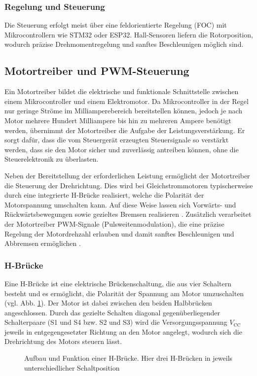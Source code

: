 \subsubsection*{Regelung und Steuerung}
Die Steuerung erfolgt meist über eine feldorientierte Regelung (FOC) mit Mikrocontrollern wie STM32 oder ESP32. Hall-Sensoren liefern die Rotorposition, wodurch präzise Drehmomentregelung und sanftes Beschleunigen möglich sind\autocite{Jaulin2025}.

\subsection{Motortreiber und PWM-Steuerung}
\label{cha:Motortreiber und PWM-Steuerung}

Ein Motortreiber bildet die elektrische und funktionale Schnittstelle zwischen einem Mikrocontroller und einem Elektromotor. Da Mikrocontroller in der Regel nur geringe Ströme im Milliamperebereich bereitstellen können, jedoch je nach Motor mehrere Hundert Milliampere bis hin zu mehreren Ampere benötigt werden, übernimmt der Motortreiber die Aufgabe der Leistungsverstärkung. Er sorgt dafür, dass die vom Steuergerät erzeugten Steuersignale so verstärkt werden, dass sie den Motor sicher und zuverlässig antreiben können, ohne die Steuerelektronik zu überlasten. 

Neben der Bereitstellung der erforderlichen Leistung ermöglicht der Motortreiber die Steuerung der Drehrichtung. Dies wird bei Gleichstrommotoren typischerweise durch eine integrierte H-Brücke realisiert, welche die Polarität der Motorspannung umschalten kann. Auf diese Weise lassen sich Vorwärts- und Rückwärtsbewegungen sowie gezieltes Bremsen realisieren \cite{schröder2018leistungselektronik}. Zusätzlich verarbeitet der Motortreiber PWM-Signale (Pulsweitenmodulation), die eine präzise Regelung der Motordrehzahl erlauben und damit sanftes Beschleunigen und Abbremsen ermöglichen \cite{bolton2015mechatronics}.

\subsubsection{H-Brücke}

Eine H-Brücke ist eine elektrische Brückenschaltung, die aus vier Schaltern besteht und es ermöglicht, die Polarität der Spannung am Motor umzuschalten (vgl. Abb. \ref{fig:H-Brücke}). Der Motor ist dabei zwischen den beiden Halbbrücken angeschlossen. Durch das gezielte Schalten diagonal gegenüberliegender Schalterpaare (S1 und S4 bzw. S2 und S3) wird die Versorgungsspannung 
$V_{\mathrm{CC}}$ jeweils in entgegengesetzter Richtung an den Motor angelegt, wodurch sich die Drehrichtung des Motors steuern lässt. \cite{hughes2019electricmotors}\cite{schröder2018leistungselektronik}
\begin{figure}[hbt]
	
	\caption{Aufbau und Funktion einer H-Brücke. Hier drei H-Brücken in jeweils unterschiedlicher Schaltposition}		
	\label{fig:H-Brücke}
\end{figure}

